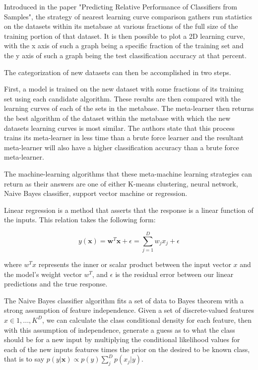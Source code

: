 \documentclass{article}
\begin{document}
Introduced in the paper "Predicting Relative Performance of Classifiers from
Samples", the strategy of nearest learning curve comparison gathers run
statistics on the datasets within its metabase at various fractions of the full
size of the training portion of that dataset. It is then possible to plot a 2D
learning curve, with the x axis of such a graph being a specific fraction of the
training set and the y axis of such a graph being the test classification
accuracy at that percent.

The categorization of new datasets can then be accomplished in two steps.

First, a model is trained on the new dataset with some fractions of its
training set using each candidate algorithm. These results are
then compared with the learning curves of each of the sets in the metabase.
The meta-learner then returns the best algorithm of the dataset within the
metabase with which the new datasets learning curves is most similar. The
authors state that this process trains its meta-learner in less time than a
brute force learner and the resultant meta-learner will also have a higher
classification accuracy than a brute force meta-learner.

The machine-learning algorithms that these meta-machine learning strategies
can return as their answers are one of either K-means clustering, neural network,
Naive Bayes classifier, support vector machine or regression.

Linear regression is a method that asserts that the response is a linear
function of the inputs. This relation takes the following form:

$$ y(\textbf{x}) = \textbf{w}^T\textbf{x} + \epsilon = \sum_{j=1}^{D}w_jx_j + \epsilon $$

where $w^Tx$ represents the inner or scalar product between the input vector $x$
and the model's weight vector $w^T$, and $\epsilon$ is the residual error
between our linear predictions and the true response.

The Naive Bayes classifier algorithm fits a set of data to Bayes theorem with a
strong assumption of feature independence. Given a set of discrete-valued
features $x \in {1,...,K}^D$, we can calculate the class conditional density for
each feature, then with this assumption of independence, generate a guess as to
what the class should be for a new input by multiplying the conditional
likelihood values for each of the new inputs features times the prior on the
desired to be known class, that is to say
$p(y|\textbf{x}) \propto p(y) \sum_{j}^{D}p(x_j|y)$.
\end{document}
